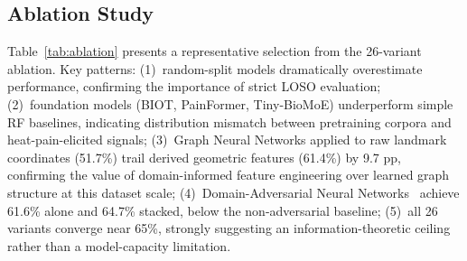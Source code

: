 \documentclass[sigconf]{acmart}
\begin{document}
\subsection{Ablation Study}

Table~\ref{tab:ablation} presents a representative selection from the 26-variant
ablation. Key patterns: (1)~random-split models dramatically overestimate
performance, confirming the importance of strict LOSO evaluation;
(2)~foundation models (BIOT, PainFormer, Tiny-BioMoE) underperform simple RF
baselines, indicating distribution mismatch between pretraining corpora and
heat-pain-elicited signals; (3)~Graph Neural Networks applied to raw landmark
coordinates (51.7\%) trail derived geometric features (61.4\%) by 9.7 pp,
confirming the value of domain-informed feature engineering over learned
graph structure at this dataset scale; (4)~Domain-Adversarial Neural
Networks~\cite{ganin2016} achieve 61.6\% alone and 64.7\% stacked, below the
non-adversarial baseline; (5)~all 26 variants converge near 65\%, strongly
suggesting an information-theoretic ceiling rather than a model-capacity
limitation.
\end{document}
